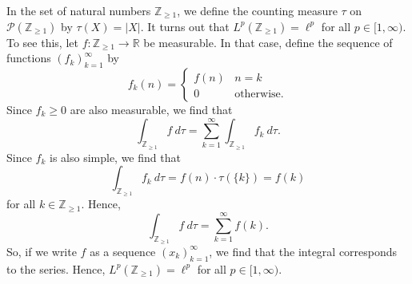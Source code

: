 \documentclass[a4paper, openany]{memoir}
\theoremstyle{definition}
\theoremstyle{plain}
\begin{document}
    In the set of natural numbers $\mathbb{Z}_{\geq 1}$, we define the counting measure $\tau$ on $\mathcal{P}(\mathbb{Z}_{\geq 1})$ by $\tau(X) = |X|$. It turns out that $L^p(\mathbb{Z}_{\geq 1}) = \ell^p$ for all $p \in [1, \infty)$. To see this, let $f \colon \mathbb{Z}_{\geq 1} \to \mathbb{R}$ be measurable. In that case, define the sequence of functions $(f_k)_{k=1}^\infty$ by 
    \[f_k(n) = \begin{cases}
        f(n) & n = k \\
        0 & \textrm{otherwise}.
    \end{cases}\]
    Since $f_k \geq 0$ are also measurable, we find that
    \[\int_{\mathbb{Z}_{\geq 1}} f \ d\tau = \sum_{k=1}^\infty \int_{\mathbb{Z}_{\geq 1}} f_k \ d\tau.\]
    Since $f_k$ is also simple, we find that
    \[\int_{\mathbb{Z}_{\geq 1}} f_k \ d\tau = f(n) \cdot \tau(\{k\}) = f(k)\]
    for all $k \in \mathbb{Z}_{\geq 1}$. Hence,
    \[\int_{\mathbb{Z}_{\geq 1}} f \ d\tau = \sum_{k=1}^\infty f(k).\]
    So, if we write $f$ as a sequence $(x_k)_{k=1}^\infty$, we find that the integral corresponds to the series. Hence, $L^p(\mathbb{Z}_{\geq 1}) = \ell^p$ for all $p \in [1, \infty)$.
\end{document}
